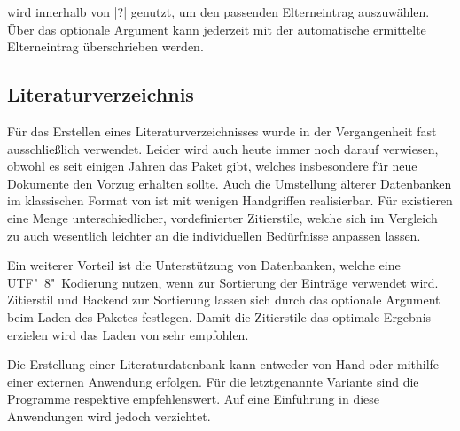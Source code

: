 \documentclass[%
  english,ngerman,%
  cdgeometry=no,DIV=12,%
  automark,%
  listof=toc,%
]{tudscrartcl}
\begin{document}
wird innerhalb von |?| genutzt, um den passenden 
Elterneintrag auszuwählen. Über das optionale Argument kann jederzeit mit 
 der automatische ermittelte 
Elterneintrag überschrieben werden.
%
\begin{Hint}
\newcommand*\symbollettergroup{}
\newcommand*{\newformulasymbol}[5][]{%
  \ifisgreeksymbol{#4}{%
    \renewcommand*{\symbollettergroup}{greekletters}%
  }{%
    \renewcommand*{\symbollettergroup}{romanletters}%
  }%
  \newglossaryentry{#2}{%
    type=symbols,%
    name={#3},%
    description={\nopostdesc},%
    symbol={\ensuremath{#4}},%
    user1={\ensuremath{\mathrm{#5}}},%
    sort={#2},%
    parent={\symbollettergroup},%
    #1%
  }%
}
\end{Hint}


\subsection{Literaturverzeichnis}
\label{sec:biblatex}%
%
Für das Erstellen eines Literaturverzeichnisses wurde in der Vergangenheit fast 
ausschließlich  verwendet. Leider wird auch heute immer noch 
darauf verwiesen, obwohl es seit einigen Jahren das Paket  
gibt, welches insbesondere für neue Dokumente den Vorzug erhalten sollte. Auch 
die Umstellung älterer Datenbanken im klassischen Format von 
ist mit wenigen Handgriffen realisierbar. Für  existieren 
eine Menge unterschiedlicher, vordefinierter Zitierstile, welche sich im 
Vergleich zu  auch wesentlich leichter an die individuellen 
Bedürfnisse anpassen lassen.

Ein weiterer Vorteil ist die Unterstützung von Datenbanken, welche eine 
UTF"~8"~Kodierung nutzen, wenn  zur Sortierung der Einträge 
verwendet wird. Zitierstil und Backend zur Sortierung lassen sich durch das 
optionale Argument beim Laden des Paketes festlegen. Damit die Zitierstile das 
optimale Ergebnis erzielen wird das Laden von  sehr empfohlen.
%
\begin{Preamble}
\usepackage{csquotes}
\usepackage[backend=biber,style=alphabetic]{biblatex}

\end{Preamble}
%
Die Erstellung einer Literaturdatenbank kann entweder von Hand oder mithilfe 
einer externen Anwendung erfolgen. Für die letztgenannte Variante sind die 
Programme  respektive  empfehlenswert. 
Auf eine Einführung in diese Anwendungen wird jedoch verzichtet. 
\end{document}
